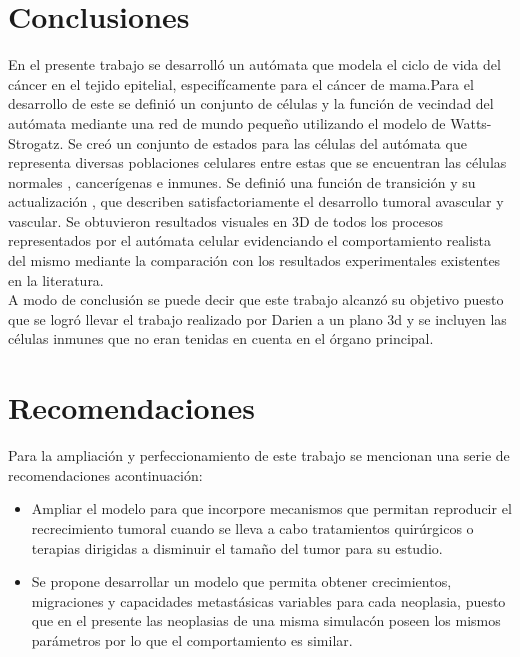 \documentclass[12pt]{amsart}
\begin{document}
\newpage
\section{\bf{Conclusiones}}
En el presente trabajo se desarroll\'o un aut\'omata que modela el ciclo de vida del c\'ancer en el tejido epitelial, especif\'icamente para el c\'ancer de mama.Para el desarrollo de este se defini\'o un conjunto de c\'elulas y la funci\'on de vecindad del aut\'omata mediante una red de mundo peque\~no utilizando el modelo de Watts-Strogatz. Se cre\'o un conjunto de estados para las c\'elulas del aut\'omata que representa diversas poblaciones celulares entre estas que se encuentran las c\'elulas normales , cancer\'igenas e inmunes. Se defini\'o una funci\'on de transici\'on y su actualizaci\'on , que describen satisfactoriamente el desarrollo tumoral avascular y vascular. Se obtuvieron resultados visuales en 3D de todos los procesos representados por el aut\'omata celular evidenciando el comportamiento realista del mismo mediante la comparaci\'on con los resultados experimentales existentes en la literatura.\\



A modo de conclusi\'on se puede decir que este trabajo alcanz\'o su objetivo puesto que se logr\'o llevar el trabajo realizado por Darien \cite{1} a un plano 3d y se incluyen las c\'elulas inmunes que no eran tenidas en cuenta en el \'organo principal.

\newpage
\section{\bf{Recomendaciones}}
Para la ampliaci\'on y perfeccionamiento de este trabajo se mencionan una serie de recomendaciones acontinuaci\'on:
\begin{itemize}
\item Ampliar el modelo para que incorpore mecanismos que permitan reproducir el recrecimiento tumoral cuando se lleva a cabo tratamientos quir\'urgicos o terapias dirigidas a disminuir el tama\~no del tumor para su estudio.
\item Se propone desarrollar un modelo que permita obtener crecimientos, migraciones y
capacidades metast\'asicas variables para cada neoplasia, puesto que en el presente las neoplasias de una misma simulac\'on poseen los mismos par\'ametros por lo que el comportamiento es similar.

\end{itemize}
\end{document}
